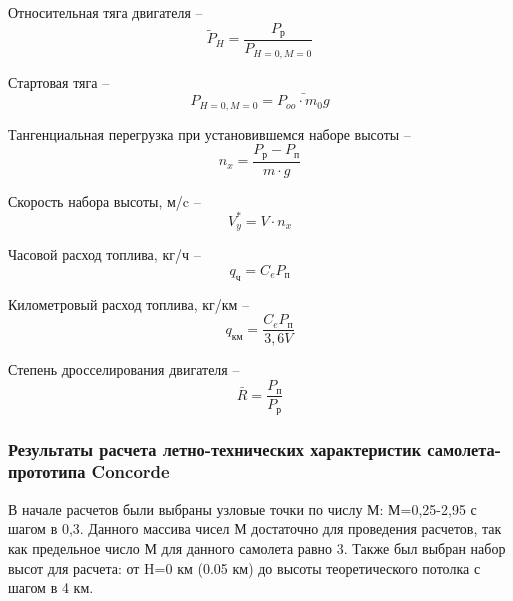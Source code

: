 Относительная тяга двигателя -- 
\begin{equation}
    \label{Относительная тяга двигателя}
    \tilde{P}_H = \frac{P_\text{р}}{P_{H=0,M=0}}
\end{equation}

Стартовая тяга --
\begin{equation}
    \label{eq:Стартовая тяга}
    P_{H=0,M=0} = \bar{P_{oo} \cdot m_0g}
\end{equation}

Тангенциальная перегрузка при установившемся наборе высоты -- 
\begin{equation}
    \label{eq:Тангенциальная перегрузка при установившемся наборе высоты}
    n_x = \frac{P_\text{р}-P_\text{п}}{m \cdot g}
\end{equation}

Скорость набора высоты, м/c --
\begin{equation}
    \label{eq:Скорость набора высоты}
    V^*_y = V \cdot n_x
\end{equation}

Часовой расход топлива, кг/ч -- 
\begin{equation}
    \label{eq:Часовой расход топлива}
    q_\text{ч} = C_e P_\text{п}
\end{equation}

Километровый расход топлива, кг/км -- 
\begin{equation}
    \label{eq:Километровый расход топлива}
    q_\text{км} = \frac{C_e P_\text{п}}{3,6V}
\end{equation}

Степень дросселирования двигателя -- 
\begin{equation}
    \label{eq:Степень дросселирования двигателя}
    \bar{R} = \frac{P_\text{п}}{P_\text{р}}
\end{equation}


\subsubsection{Результаты расчета летно-технических характеристик
самолета-прототипа Concorde}
\label{sec:Результаты расчета летно-технических характеристик
самолета-прототипа Concorde}

В начале расчетов были выбраны узловые точки по числу М: М=0,25-2,95 с шагом в 0,3. Данного массива чисел М достаточно для проведения расчетов, так как предельное число М для данного самолета равно 3. Также был выбран набор высот для расчета: от H=0 км (0.05 км) до высоты теоретического потолка с шагом в 4 км.

